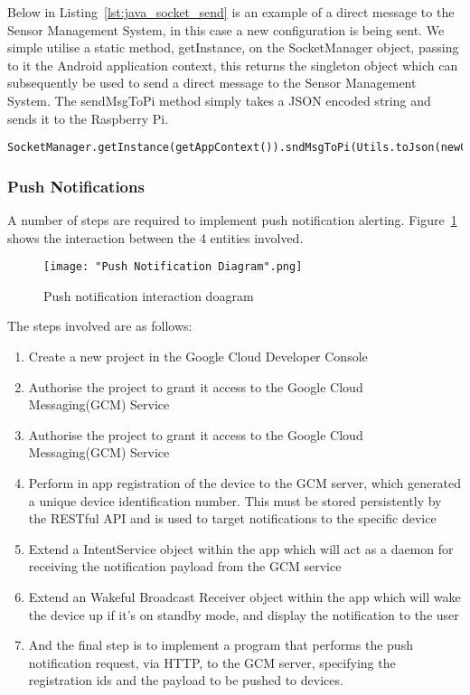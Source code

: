 \documentclass{article}
\begin{document}
Below in Listing~\ref{lst:java_socket_send} is an example of a direct message to the Sensor Management System, in this case a new configuration is being sent. We simple utilise a static method, getInstance, on the SocketManager object, passing to it the Android application context, this returns the singleton object which can subsequently be used to send a direct message to the Sensor Management System. The sendMsgToPi method simply takes a JSON encoded string and sends it to the Raspberry Pi. 
\begin{lstlisting}[caption={Singleton SocketManager object send message method invocation},label={lst:java_socket_send}]
SocketManager.getInstance(getAppContext()).sndMsgToPi(Utils.toJson(newConfig);
\end{lstlisting}	

\newpage
\subsubsection{Push Notifications}
\label{sssec:android_push_notifications}
A number of steps are required to implement push notification alerting. Figure~\ref{fig:android_pn_interaction} shows the interaction between the 4 entities involved. 

\begin{figure}[H]
\centering
\texttt{[image: "Push Notification Diagram".png]}
\caption{Push notification interaction doagram}
\label{fig:android_pn_interaction}
\end{figure}

The steps involved are as follows:  
\begin{enumerate}
  \item Create a new project in the Google Cloud Developer Console
  \item Authorise the project to grant it access to the Google Cloud Messaging(GCM) Service
  \item Authorise the project to grant it access to the Google Cloud Messaging(GCM) Service
  \item Perform in app registration of the device to the GCM server, which generated a unique device identification number. This must be stored persistently by the RESTful API and is used to target notifications to the specific device
  \item Extend a IntentService object within the app which will act as a daemon for receiving the notification payload from the GCM service
  \item Extend an Wakeful Broadcast Receiver object within the app which will wake the device up if it’s on standby mode, and display the notification to the user
  \item And the final step is to implement a program that performs the push notification request, via HTTP, to the GCM server, specifying the registration ids and the payload to be pushed to devices. 
\end{enumerate}	
\end{document}
